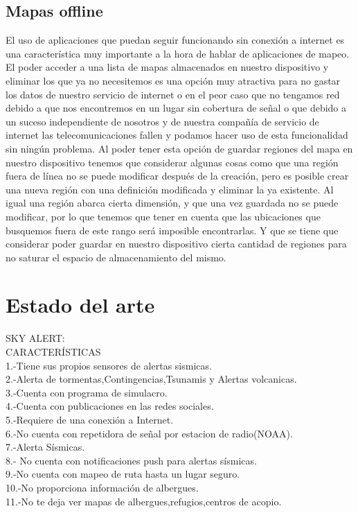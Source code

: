 \subsection{Mapas offline}
El uso de aplicaciones que puedan seguir funcionando sin conexión a internet es una característica muy importante a la hora de hablar de aplicaciones de mapeo. El poder acceder a una lista de mapas almacenados en nuestro dispositivo y eliminar los que ya no necesitemos es una opción muy atractiva para no gastar los datos de nuestro servicio de internet o en el peor caso que no tengamos red debido a que nos encontremos en un lugar sin cobertura de señal o que debido a un suceso independiente de nosotros y de nuestra compañía de servicio de internet las telecomunicaciones fallen y podamos hacer uso de esta funcionalidad sin ningún problema. 
Al poder tener esta opción de guardar regiones del mapa en nuestro dispositivo tenemos que considerar algunas cosas como que una región fuera de línea no se puede modificar después de la creación, pero es posible crear una nueva región con una definición modificada y eliminar la ya existente. Al igual una región abarca cierta dimensión, y que una vez guardada no se puede modificar, por lo que tenemos que tener en cuenta que las ubicaciones que busquemos fuera de este rango será imposible encontrarlas. Y que se tiene que considerar poder guardar en nuestro dispositivo cierta cantidad de regiones para no saturar el espacio de almacenamiento del mismo.

\section{Estado del arte}
SKY ALERT:\\CARACTERÍSTICAS\\1.-Tiene sus propios sensores de alertas sismicas.\\2.-Alerta de tormentas,Contingencias,Tsunamis y Alertas volcanicas.\\3.-Cuenta con programa de simulacro.\\4.-Cuenta con publicaciones en las redes sociales.\\5.-Requiere de una conexión a Internet.\\6.-No cuenta con repetidora de señal por estacion de radio(NOAA).\\7.-Alerta Sísmicas.\\8.- No cuenta con notificaciones push para alertas sísmicas.\\9.-No cuenta con mapeo de ruta hasta un lugar seguro.\\10.-No proporciona información de albergues.\\11.-No te deja ver mapas de albergues,refugios,centros de acopio.\\ 
\\


